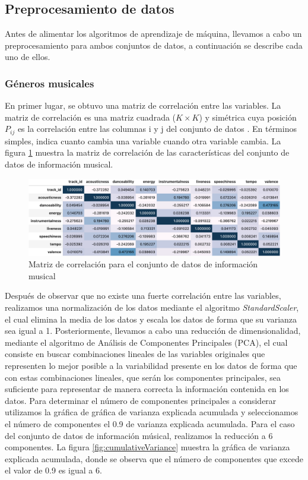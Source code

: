 \documentclass[runningheads]{llncs}
\begin{document}
\subsection{Preprocesamiento de datos}\label{subsec:Preproc}
Antes de alimentar los algoritmos de aprendizaje de máquina, llevamos a cabo un preprocesamiento para ambos conjuntos de datos, a continuación se describe cada uno de ellos.
\subsubsection{Géneros musicales}
En primer lugar, se obtuvo una matriz de correlación entre las variables. La matriz de correlación es una matriz cuadrada ($K \times K$) y simétrica cuya posición $P_{ij}$ es la correlación entre las columnas i y j del conjunto de datos \cite{Brown2009ComprehensiveCS}. En términos simples, indica cuanto cambia una variable cuando otra variable cambia. La figura \ref{fig:corrMatrix} muestra la matriz de correlación de las características del conjunto de datos de información musical.

\begin{figure}[h]
    \centering
    \includegraphics[scale=0.35]{img/corrMatrix.png}
    \caption{Matriz de correlación para el conjunto de datos de información musical}
    \label{fig:corrMatrix}
\end{figure}

Después de observar que no existe una fuerte correlación entre las variables, realizamos una normalización de los datos mediante el algoritmo \textit{StandardScaler}, el cual  elimina la media de los datos y escala los datos de forma que su varianza sea igual a 1. Posteriormente, llevamos a cabo una reducción de dimensionalidad, mediante el algoritmo de Análisis de Componentes Principales (PCA)\cite{pca}, el cual consiste en buscar combinaciones lineales de las variables originales que representen lo mejor posible a la variabilidad presente en los datos de forma que con estas combinaciones lineales, que serán los componentes principales, sea suficiente para representar de manera correcta la información contenida en los datos. Para determinar el número de componentes principales a considerar utilizamos la gráfica de gráfica de varianza explicada acumulada y seleccionamos el número de componentes el 0.9 de varianza explicada acumulada. Para el caso del conjunto de datos de información músical, realizamos la reducción a 6 componentes. La figura \ref{fig:cumulativeVariance} muestra la gráfica de varianza explicada acumulada, donde se observa que el número de componentes que excede el valor de 0.9 es igual a 6.
\end{document}
